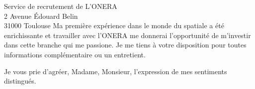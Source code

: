 \documentclass[12pt]{lettre}
\begin{document}
\begin{letter}{Service de recrutement de L'ONERA\\2 Avenue Édouard Belin\\31000 Toulouse}
%
Ma première expérience dans le monde du spatiale a été enrichissante et  travailler avec l'ONERA me donnerai l'opportunité de m'investir dans cette branche qui me passione.
%
Je me tiens à votre disposition pour toutes informations complémentaire ou un entretient.
\closing{Je vous prie d'agréer, Madame, Monsieur, l'expression de mes sentiments distingués.}
\end{letter}
 
\end{document}
